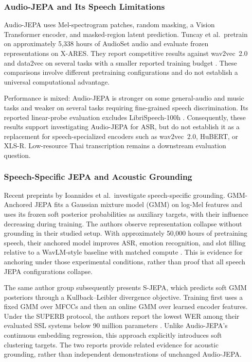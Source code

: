 \documentclass[conference]{IEEEtran}
\begin{document}
\subsubsection{Audio-JEPA and Its Speech Limitations}
Audio-JEPA uses Mel-spectrogram patches, random masking, a Vision Transformer encoder, and masked-region latent prediction. Tuncay et al.\ pretrain on approximately 5,338 hours of AudioSet audio and evaluate frozen representations on X-ARES. They report competitive results against wav2vec~2.0 and data2vec on several tasks with a smaller reported training budget \cite{tuncay2025audiojepa}. These comparisons involve different pretraining configurations and do not establish a universal computational advantage.

Performance is mixed: Audio-JEPA is stronger on some general-audio and music tasks and weaker on several tasks requiring fine-grained speech discrimination. Its reported linear-probe evaluation excludes LibriSpeech-100h \cite{tuncay2025audiojepa}. Consequently, these results support investigating Audio-JEPA for ASR, but do not establish it as a replacement for speech-specialized encoders such as wav2vec~2.0, HuBERT, or XLS-R. Low-resource Thai transcription remains a downstream evaluation question.

\subsubsection{Speech-Specific JEPA and Acoustic Grounding}
Recent preprints by Ioannides et al.\ investigate speech-specific grounding. GMM-Anchored JEPA fits a Gaussian mixture model (GMM) on log-Mel features and uses its frozen soft posterior probabilities as auxiliary targets, with their influence decreasing during training. The authors observe representation collapse without grounding in their studied setup. With approximately 50,000 hours of pretraining speech, their anchored model improves ASR, emotion recognition, and slot filling relative to a WavLM-style baseline with matched compute \cite{ioannides2026gmmjepa}. This is evidence for anchoring under those experimental conditions, rather than proof that all speech JEPA configurations collapse.

The same author group subsequently presents S-JEPA, which predicts soft GMM posteriors through a Kullback--Leibler divergence objective. Training first uses a fixed GMM over MFCCs and then an online GMM over learned encoder features. Under the SUPERB protocol, the authors report the lowest WER among their evaluated SSL systems below 90 million parameters \cite{ioannides2026sjepa}. Unlike Audio-JEPA's continuous embedding regression, this approach explicitly introduces soft clustering targets. The two reports provide related evidence for acoustic grounding, rather than independent demonstrations of unchanged Audio-JEPA.
\end{document}
